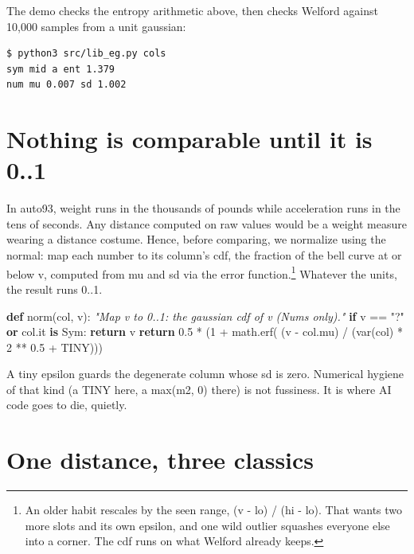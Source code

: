\documentclass[
  justified]{tufte-book}
\newenvironment{Shaded}{}{}
\newcommand{\CommentTok}[1]{\textcolor[rgb]{0.38,0.63,0.69}{\textit{#1}}}
\newcommand{\ControlFlowTok}[1]{\textcolor[rgb]{0.00,0.44,0.13}{\textbf{#1}}}
\newcommand{\DecValTok}[1]{\textcolor[rgb]{0.25,0.63,0.44}{#1}}
\newcommand{\FloatTok}[1]{\textcolor[rgb]{0.25,0.63,0.44}{#1}}
\newcommand{\KeywordTok}[1]{\textcolor[rgb]{0.00,0.44,0.13}{\textbf{#1}}}
\newcommand{\NormalTok}[1]{#1}
\newcommand{\OperatorTok}[1]{\textcolor[rgb]{0.40,0.40,0.40}{#1}}
\newcommand{\StringTok}[1]{\textcolor[rgb]{0.25,0.44,0.63}{#1}}
\begin{document}
The demo checks the entropy arithmetic above, then checks Welford
against 10,000 samples from a unit gaussian:

\begin{verbatim}
$ python3 src/lib_eg.py cols
sym mid a ent 1.379
num mu 0.007 sd 1.002
\end{verbatim}

\section{Nothing is comparable until it is
0..1}\label{nothing-is-comparable-until-it-is-0..1}

In auto93, weight runs in the thousands of pounds while acceleration
runs in the tens of seconds. Any distance computed on raw values would
be a weight measure wearing a distance costume. Hence, before comparing,
we normalize using the normal: map each number to its column's cdf, the
fraction of the bell curve at or below v, computed from mu and sd via
the error function.\footnote{An older habit rescales by the seen range,
  (v - lo) / (hi - lo). That wants two more slots and its own epsilon,
  and one wild outlier squashes everyone else into a corner. The cdf
  runs on what Welford already keeps.} Whatever the units, the result
runs 0..1.

\begin{Shaded}
\begin{Highlighting}[]
\KeywordTok{def}\NormalTok{ norm(col, v):}
  \CommentTok{"Map v to 0..1: the gaussian cdf of v (Nums only)."}
  \ControlFlowTok{if}\NormalTok{ v }\OperatorTok{==} \StringTok{"?"} \KeywordTok{or}\NormalTok{ col.it }\KeywordTok{is}\NormalTok{ Sym: }\ControlFlowTok{return}\NormalTok{ v}
  \ControlFlowTok{return} \FloatTok{0.5} \OperatorTok{*}\NormalTok{ (}\DecValTok{1} \OperatorTok{+}\NormalTok{ math.erf(}
\NormalTok{    (v }\OperatorTok{{-}}\NormalTok{ col.mu) }\OperatorTok{/}\NormalTok{ (var(col) }\OperatorTok{*} \DecValTok{2} \OperatorTok{**} \FloatTok{0.5} \OperatorTok{+}\NormalTok{ TINY)))}
\end{Highlighting}
\end{Shaded}

A tiny epsilon guards the degenerate column whose sd is zero. Numerical
hygiene of that kind (a TINY here, a max(m2, 0) there) is not fussiness.
It is where AI code goes to die, quietly.

\section{One distance, three
classics}\label{one-distance-three-classics}
\end{document}
